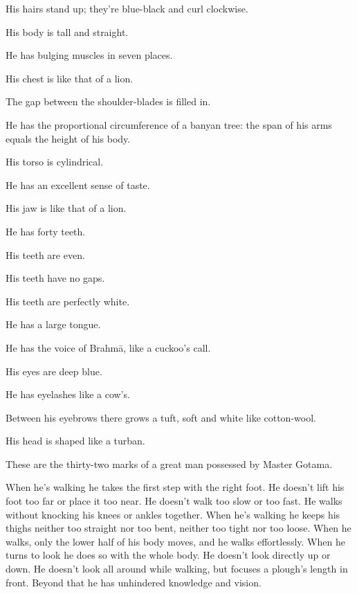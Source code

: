 \documentclass[12pt,openany]{book}%
\begin{document}
His hairs stand up; they’re blue-black and curl clockwise. 

His body is tall and straight. 

He has bulging muscles in seven places. 

His chest is like that of a lion. 

The gap between the shoulder-blades is filled in. 

He has the proportional circumference of a banyan tree: the span of his arms equals the height of his body. 

His torso is cylindrical. 

He has an excellent sense of taste. 

His jaw is like that of a lion. 

He has forty teeth. 

His teeth are even. 

His teeth have no gaps. 

His teeth are perfectly white. 

He has a large tongue. 

He has the voice of \textsanskrit{Brahmā}, like a cuckoo’s call. 

His eyes are deep blue. 

He has eyelashes like a cow’s. 

Between his eyebrows there grows a tuft, soft and white like cotton-wool. 

His head is shaped like a turban. 

These are the thirty-two marks of a great man possessed by Master Gotama. 

When he’s walking he takes the first step with the right foot. He doesn’t lift his foot too far or place it too near. He doesn’t walk too slow or too fast. He walks without knocking his knees or ankles together. When he’s walking he keeps his thighs neither too straight nor too bent, neither too tight nor too loose. When he walks, only the lower half of his body moves, and he walks effortlessly. When he turns to look he does so with the whole body. He doesn’t look directly up or down. He doesn’t look all around while walking, but focuses a plough’s length in front. Beyond that he has unhindered knowledge and vision. 
\end{document}
